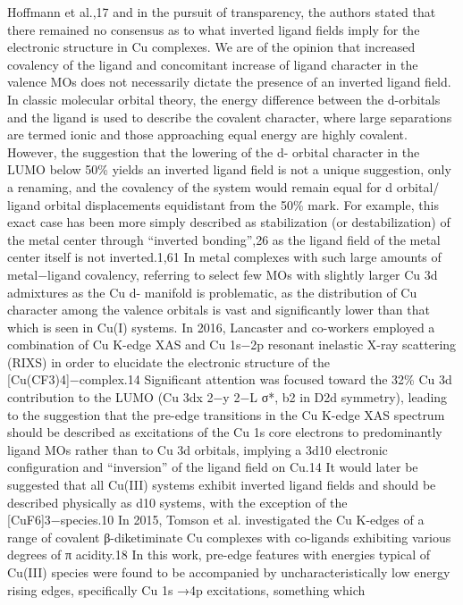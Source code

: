 \documentclass{article}
\begin{document}
Hoﬀmann et al.,17 and in the pursuit of transparency, the
authors stated that there remained no consensus as to what
inverted ligand ﬁelds imply for the electronic structure in Cu
complexes. We are of the opinion that increased covalency of
the ligand and concomitant increase of ligand character in the
valence MOs does not necessarily dictate the presence of an
inverted ligand ﬁeld. In classic molecular orbital theory, the
energy diﬀerence between the d-orbitals and the ligand is used
to describe the covalent character, where large separations are
termed ionic and those approaching equal energy are highly
covalent. However, the suggestion that the lowering of the d-
orbital character in the LUMO below 50\% yields an inverted
ligand ﬁeld is not a unique suggestion, only a renaming, and
the covalency of the system would remain equal for d orbital/
ligand orbital displacements equidistant from the 50\% mark.
For example, this exact case has been more simply described as
stabilization (or destabilization) of the metal center through
“inverted bonding”,26 as the ligand ﬁeld of the metal center
itself is not inverted.1,61 In metal complexes with such large
amounts of metal−ligand covalency, referring to select few
MOs with slightly larger Cu 3d admixtures as the Cu d-
manifold is problematic, as the distribution of Cu character
among the valence orbitals is vast and signiﬁcantly lower than
that which is seen in Cu(I) systems.
In 2016, Lancaster and co-workers employed a combination
of Cu K-edge XAS and Cu 1s−2p resonant inelastic X-ray
scattering (RIXS) in order to elucidate the electronic structure
of the [Cu(CF3)4]−complex.14 Signiﬁcant attention was
focused toward the 32\% Cu 3d contribution to the LUMO
(Cu 3dx
2−y
2−L σ*, b2 in D2d symmetry), leading to the
suggestion that the pre-edge transitions in the Cu K-edge XAS
spectrum should be described as excitations of the Cu 1s core
electrons to predominantly ligand MOs rather than to Cu 3d
orbitals, implying a 3d10 electronic conﬁguration and
“inversion” of the ligand ﬁeld on Cu.14 It would later be
suggested that all Cu(III) systems exhibit inverted ligand ﬁelds
and should be described physically as d10 systems, with the
exception of the [CuF6]3−species.10
In 2015, Tomson et al. investigated the Cu K-edges of a
range of covalent β-diketiminate Cu complexes with co-ligands
exhibiting various degrees of π acidity.18 In this work, pre-edge
features with energies typical of Cu(III) species were found to
be accompanied by uncharacteristically low energy rising
edges, speciﬁcally Cu 1s →4p excitations, something which
\end{document}
